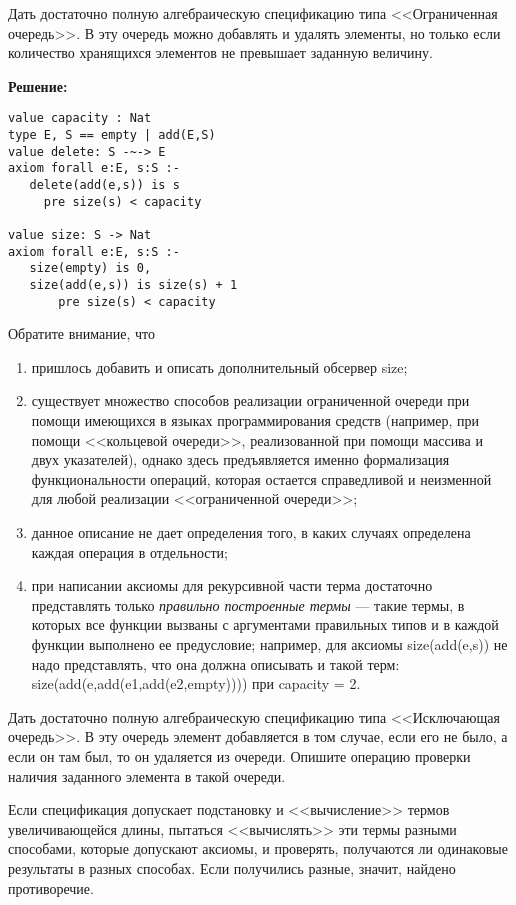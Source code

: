 \z Дать достаточно полную алгебраическую спецификацию типа <<Ограниченная очередь>>. В эту очередь можно добавлять и удалять элементы, но только если количество хранящихся элементов не превышает заданную величину.

\textbf{Решение:}
\begin{lstlisting}
value capacity : Nat
type E, S == empty | add(E,S)
value delete: S -~-> E
axiom forall e:E, s:S :-
   delete(add(e,s)) is s
     pre size(s) < capacity

value size: S -> Nat
axiom forall e:E, s:S :-
   size(empty) is 0,
   size(add(e,s)) is size(s) + 1
       pre size(s) < capacity
\end{lstlisting}

Обратите внимание, что
\begin{enumerate}
\item пришлось добавить и описать дополнительный обсервер size;
\item существует множество способов реализации ограниченной очереди при помощи имеющихся в языках программирования средств (например, при помощи <<кольцевой очереди>>, реализованной при помощи массива и двух указателей), однако здесь предъявляется именно формализация функциональности операций, которая остается справедливой и неизменной для любой реализации <<ограниченной очереди>>;
\item данное описание не дает определения того, в каких случаях определена каждая операция в отдельности;
\item при написании аксиомы для рекурсивной части терма достаточно представлять только \emph{правильно построенные термы} --- такие термы, в которых все функции вызваны с аргументами правильных типов и в каждой функции выполнено ее предусловие; например, для аксиомы size(add(e,s)) не надо представлять, что она должна описывать и такой терм: size(add(e,add(e1,add(e2,empty)))) при capacity = 2.
\end{enumerate}

\z Дать достаточно полную алгебраическую спецификацию типа <<Исключающая очередь>>. В эту очередь элемент добавляется в том случае, если его не было, а если он там был, то он удаляется из очереди. Опишите операцию проверки наличия заданного элемента в такой очереди.



Если спецификация допускает подстановку и <<вычисление>> термов увеличивающейся длины, пытаться <<вычислять>> эти термы разными способами, которые допускают аксиомы, и проверять, получаются ли одинаковые результаты в разных способах. Если получились разные, значит, найдено противоречие.

